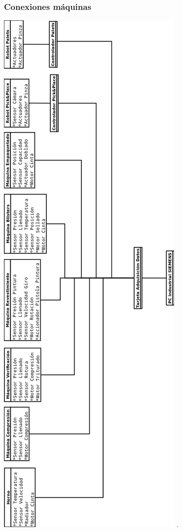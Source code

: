 \subsubsection{Conexiones máquinas}
\hfill
\includegraphics[scale=0.5]{Planos/conexiones.png}
\hfill.
\newpage
	
